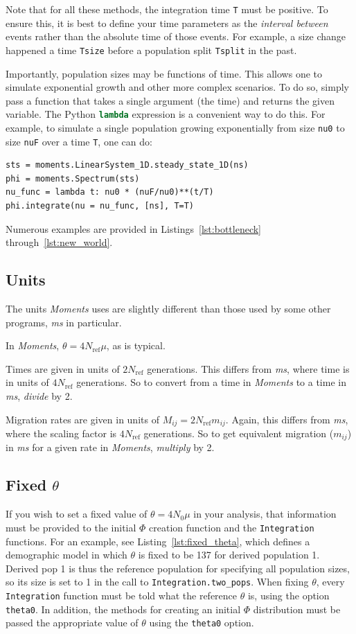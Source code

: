 \documentclass[12pt]{article}
\makeatletter
\newcommand{\Nref}{\ensuremath{N_\text{ref}}\xspace}
\newcommand{\ms}{\emph{ms}\xspace}
\newcommand{\py}[1]{\lstinline[language=Python, showstringspaces=False]@#1@}
\makeatother
\begin{document}
Note that for all these methods, the integration time \py{T} must be positive.
To ensure this, it is best to define your time parameters as the \emph{interval between} events rather than the absolute time of those events.
For example, a size change happened a time \py{Tsize} before a population split \py{Tsplit} in the past.

Importantly, population sizes may be functions of time.
This allows one to simulate exponential growth and other more complex scenarios.
To do so, simply pass a function that takes a single argument (the time) and returns the given variable.
The Python \py{lambda} expression is a convenient way to do this.
For example, to simulate a single population growing exponentially from size \py{nu0} to size \py{nuF} over a time \py{T}, one can do:
\begin{lstlisting}
sts = moments.LinearSystem_1D.steady_state_1D(ns)
phi = moments.Spectrum(sts) 
nu_func = lambda t: nu0 * (nuF/nu0)**(t/T)
phi.integrate(nu = nu_func, [ns], T=T)
\end{lstlisting}

Numerous examples are provided in Listings~\ref{lst:bottleneck} through~\ref{lst:new_world}.

\subsection{Units}
The units \textit{Moments} uses are slightly different than those used by some other programs, \ms in particular.

In \textit{Moments}, $\theta = 4 \Nref \mu$, as is typical.

Times are given in units of $2 \Nref$ generations.
This differs from \emph{ms}, where time is in units of $4 \Nref$ generations.
So to convert from a time in \textit{Moments} to a time in \emph{ms}, \emph{divide} by 2.

Migration rates are given in units of $M_{ij} = 2 \Nref m_{ij}$.
Again, this differs from \emph{ms}, where the scaling factor is $4 \Nref$ generations.
So to get equivalent migration ($m_{ij}$) in \ms for a given rate in \textit{Moments}, \emph{multiply} by 2.


\subsection{Fixed $\theta$}\label{sec:fixed_theta}

If you wish to set a fixed value of $\theta = 4 N_0 \mu$ in your analysis, that information must be provided to the initial $\Phi$ creation function and the \py{Integration} functions.
For an example, see Listing~\ref{lst:fixed_theta}, which defines a demographic model in which $\theta$ is fixed to be 137 for derived population 1.
Derived pop 1 is thus the reference population for specifying all population sizes, so its size is set to 1 in the call to \py{Integration.two_pops}.
When fixing $\theta$, every \py{Integration} function must be told what the reference $\theta$ is, using the option \py{theta0}.
In addition, the methods for creating an initial $\Phi$ distribution must be passed the appropriate value of $\theta$ using the \py{theta0} option.
\end{document}
